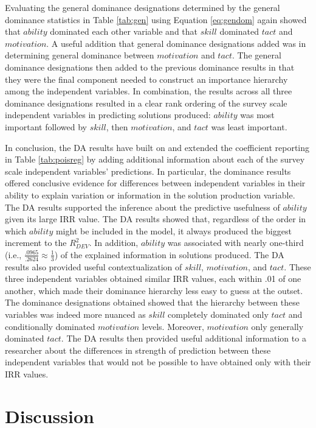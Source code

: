 \documentclass[man]{apa7}
\begin{document}
	Evaluating the general dominance designations determined by the general dominance statistics in Table \ref{tab:gen} using Equation \ref{eq:gendom} again showed that $ability$ dominated each other variable and that $skill$ dominated $tact$ and $motivation$. 
	A useful addition that general dominance designations added was in determining general dominance between $motivation$ and $tact$.
	The general dominance designations then added to the previous dominance results in that they were the final component needed to construct an importance hierarchy among the independent variables.
	In combination, the results across all three dominance designations resulted in a clear rank ordering of the survey scale independent variables in predicting solutions produced: $ability$ was most important followed by $skill$, then $motivation$, and $tact$ was least important.
	
	In conclusion, the DA results have built on and extended the coefficient reporting in Table \ref{tab:poisreg} by adding additional information about each of the survey scale independent variables' predictions.
	In particular, the dominance results offered conclusive evidence for differences between independent variables in their ability to explain variation or information in the solution production variable. 
	The DA results supported the inference about the predictive usefulness of $ability$ given its large IRR value. 
	The DA results showed that, regardless of the order in which $ability$ might be included in the model, it always produced the biggest increment to the $R^2_{DEV}$. 
	In addition, $ability$ was associated with nearly one-third (i.e., $\frac{.0965}{.2624} \approx \frac{1}{3}$) of the explained information in solutions produced.
	The DA results also provided useful contextualization of $skill$, $motivation$, and $tact$.
	These three independent variables obtained similar IRR values, each within .01 of one another, which made their dominance hierarchy less easy to guess at the outset.
	The dominance designations obtained showed that the hierarchy between these variables was indeed more nuanced as $skill$ completely dominated only $tact$ and conditionally dominated $motivation$ levels. 
	Moreover, $motivation$ only generally dominated $tact$.
	The DA results then provided useful additional information to a researcher about the differences in strength of prediction between these independent variables that would not be possible to have obtained only with their IRR values.
	
\section{Discussion}
\end{document}
